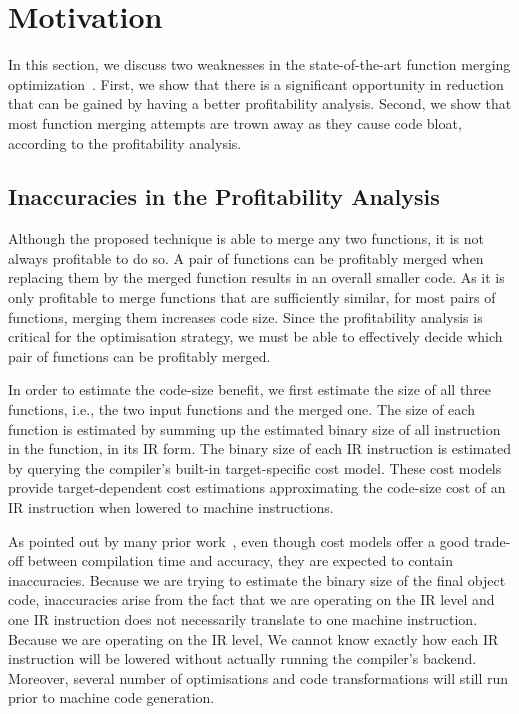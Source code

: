 \section{Motivation} \label{sec:motivation}

In this section, we discuss two weaknesses in the state-of-the-art function merging optimization~\cite{rocha20}.
First, we show that there is a significant opportunity in reduction that can be gained by having a better profitability analysis.
Second, we show that most function merging attempts are trown away as they cause code bloat, according to the profitability analysis.

\subsection{Inaccuracies in the Profitability Analysis}

Although the proposed technique is able to merge any two functions, it is not always profitable to do so.
A pair of functions can be profitably merged when replacing them by the merged function results in an overall smaller code.
As it is only profitable to merge functions that are sufficiently similar, for most pairs of functions, merging them increases code size.
Since the profitability analysis is critical for the optimisation strategy, we must be able to effectively decide which pair of functions can be profitably merged.

In order to estimate the code-size benefit, we first estimate the size of all three functions, i.e., the two input functions and the merged one.
The size of each function is estimated by summing up the estimated binary size of all instruction in the function, in its IR form.
The binary size of each IR instruction is estimated by querying the compiler's built-in target-specific cost model.
These cost models provide target-dependent cost estimations approximating the code-size cost of an IR instruction when lowered to machine instructions.

As pointed out by many prior work~\cite{porpodas18,rocha19,rocha20}, even though cost models offer a good trade-off between compilation time and accuracy, they are expected to contain inaccuracies.
Because we are trying to estimate the binary size of the final object code, inaccuracies arise from the fact that we are operating on the IR level and one IR instruction does not necessarily translate to one machine instruction.
Because we are operating on the IR level, We cannot know exactly how each IR instruction will be lowered without actually running the compiler's backend.
Moreover, several number of optimisations and code transformations will still run prior to machine code generation.

